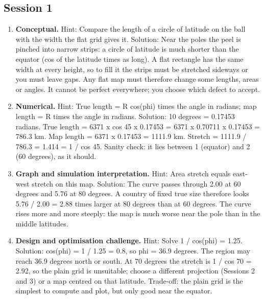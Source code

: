 \documentclass[11pt,a4paper]{article}
\begin{document}
\subsection*{Session 1}
\begin{enumerate}[nosep]
\item \textbf{Conceptual.} Hint: Compare the length of a circle of latitude on the ball with the width the flat grid gives it. Solution: Near the poles the peel is pinched into narrow strips: a circle of latitude is much shorter than the equator (cos of the latitude times as long). A flat rectangle has the same width at every height, so to fill it the strips must be stretched sideways or you must leave gaps. Any flat map must therefore change some lengths, areas or angles. It cannot be perfect everywhere; you choose which defect to accept.
\item \textbf{Numerical.} Hint: True length = R cos(phi) times the angle in radians; map length = R times the angle in radians. Solution: 10 degrees = 0.17453 radians. True length = 6371 x cos 45 x 0.17453 = 6371 x 0.70711 x 0.17453 = 786.3 km. Map length = 6371 x 0.17453 = 1111.9 km. Stretch = 1111.9 / 786.3 = 1.414 = 1 / cos 45. Sanity check: it lies between 1 (equator) and 2 (60 degrees), as it should.
\item \textbf{Graph and simulation interpretation.} Hint: Area stretch equals east-west stretch on this map. Solution: The curve passes through 2.00 at 60 degrees and 5.76 at 80 degrees. A country of fixed true size therefore looks 5.76 / 2.00 = 2.88 times larger at 80 degrees than at 60 degrees. The curve rises more and more steeply: the map is much worse near the pole than in the middle latitudes.
\item \textbf{Design and optimisation challenge.} Hint: Solve 1 / cos(phi) = 1.25. Solution: cos(phi) = 1 / 1.25 = 0.8, so phi = 36.9 degrees. The region may reach 36.9 degrees north or south. At 70 degrees the stretch is 1 / cos 70 = 2.92, so the plain grid is unsuitable; choose a different projection (Sessions 2 and 3) or a map centred on that latitude. Trade-off: the plain grid is the simplest to compute and plot, but only good near the equator.
\end{enumerate}
\end{document}
